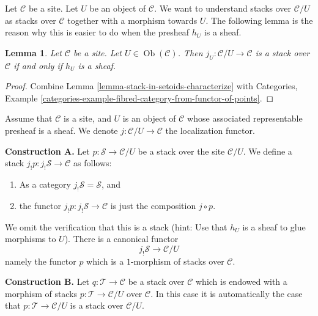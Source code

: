 \documentclass{stacks-project}
\theoremstyle{plain}
\newtheorem{lemma}[subsection]{Lemma}
\theoremstyle{definition}
\theoremstyle{remark}
\numberwithin{equation}{subsection}
\def\Ob{\mathop{\mathrm{Ob}}\nolimits}
\begin{document}
\noindent
Let $\mathcal{C}$ be a site.
Let $U$ be an object of $\mathcal{C}$.
We want to understand stacks over $\mathcal{C}/U$ as stacks
over $\mathcal{C}$ together with a morphism towards $U$.
The following lemma is the reason why this is easier to do
when the presheaf $h_U$ is a sheaf.

\begin{lemma}
\label{lemma-when-localization-stack}
Let $\mathcal{C}$ be a site. Let $U \in \Ob(\mathcal{C})$.
Then $j_U : \mathcal{C}/U \to \mathcal{C}$ is a stack over $\mathcal{C}$
if and only if $h_U$ is a sheaf.
\end{lemma}

\begin{proof}
Combine
Lemma \ref{lemma-stack-in-setoids-characterize}
with
Categories,
Example \ref{categories-example-fibred-category-from-functor-of-points}.
\end{proof}

\noindent
Assume that $\mathcal{C}$ is a site,
and $U$ is an object of $\mathcal{C}$ whose associated representable
presheaf is a sheaf. We denote $j : \mathcal{C}/U \to \mathcal{C}$
the localization functor.

\medskip\noindent
{\bf Construction A.} Let $p : \mathcal{S} \to \mathcal{C}/U$ be a stack
over the site $\mathcal{C}/U$. We define a stack
$j_!p : j_!\mathcal{S} \to \mathcal{C}$ as follows:
\begin{enumerate}
\item As a category $j_!\mathcal{S} = \mathcal{S}$, and
\item the functor $j_!p : j_!\mathcal{S} \to \mathcal{C}$
is just the composition $j \circ p$.
\end{enumerate}
We omit the verification that this is a stack (hint: Use that
$h_U$ is a sheaf to glue morphisms to $U$). There is a canonical
functor
$$
j_!\mathcal{S} \longrightarrow \mathcal{C}/U
$$
namely the functor $p$ which is a $1$-morphism of stacks over $\mathcal{C}$.

\medskip\noindent
{\bf Construction B.}
Let $q : \mathcal{T} \to \mathcal{C}$ be a stack over $\mathcal{C}$
which is endowed with a morphism of stacks $p : \mathcal{T} \to \mathcal{C}/U$
over $\mathcal{C}$. In this case it is automatically the case that
$p : \mathcal{T} \to \mathcal{C}/U$ is a stack over $\mathcal{C}/U$.
\end{document}
